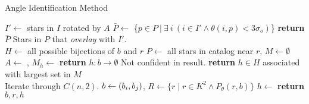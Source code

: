 
\newcommand{\invalidBijection}{\If{$\forall \ \vv{b^\star}, \ \vv{b^\star} \in b \land h\left(\vv{b^\star}\right)
\neq \emptyset$}}
\begin{algorithm}
    \caption{Angle Identification Method} \label{algorithm:angleIdentification}
    \begin{algorithmic}[1]
        \State $I' \gets$ stars in $I$ rotated by $A$
        \State $\bar{P} \gets $ \{$p \in P \ | \ \exists \ i \ (i \in I' \land \theta (i, p) < 3\sigma_o)$\}
        \State \textbf{return} $\bar{P}$ \Comment Stars in $P$ that \textit{overlay} with $I'$.
        \EndFunction
        \\
        \State $H \gets $ all possible bijections of $b$ and $r$
        \State $P \gets $ all stars in catalog near $r$, $M \gets \emptyset$
        \State $A \gets $ , $M_h \gets $ 
        \EndFor
        \State \textbf{return} $h : b \rightarrow \emptyset $ \Comment Not confident in result.
        \Else
        \State \textbf{return} $h \in H$ associated with largest set in $M$
        \EndIf
        \EndFunction
        \\
         \Comment Iterate through $C(n, 2)$.
        \State $b \gets \left(b_i, b_j\right)$, $R \gets \{ r \mid r \in K^2 \land P_\theta(r, b) \}$
        \State $h \gets $  %
        \invalidBijection
        \State \textbf{return} $b, r, h$
        \EndIf
        \EndIf
        \EndFor
        \EndFor
        \EndFunction
    \end{algorithmic}
\end{algorithm}

